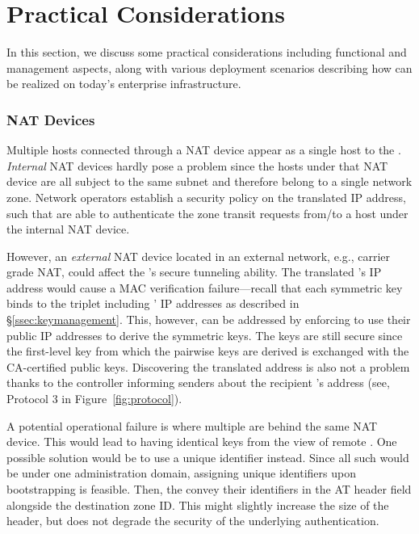 \chapter{Practical Considerations}
\label{practical}

In this section, we discuss some practical considerations including functional and 
management aspects, along with various deployment scenarios describing how \name can
be realized on today's enterprise infrastructure. 


\subsection{NAT Devices}
\label{ssec:nat}
Multiple hosts connected through a NAT device appear as a single host to the
\tp. \textit{Internal} NAT devices hardly pose a problem since the hosts under that NAT 
device are all subject to the same subnet and therefore belong to a single network zone. 
Network operators establish a security policy on the translated IP address, such 
that \tps are able to authenticate the zone transit requests from/to a host under the
internal NAT device.

However, an \textit{external} NAT device located in an external network, e.g., carrier grade NAT, 
could affect the \tp's secure tunneling ability. The translated \tp's IP address
would cause a MAC verification failure---recall that each symmetric key binds to the
triplet including \tps' IP addresses as described in \S\ref{ssec:keymanagement}. 
This, however, can be addressed by enforcing \tps to use their public IP addresses
to derive the symmetric keys. The keys are still secure since the first-level key
from which the pairwise keys are derived is exchanged with the CA-certified public
keys. Discovering the translated \tp address is also not a problem thanks to
the controller informing senders about the recipient \tp's address (see, Protocol 3 in 
Figure~\ref{fig:protocol}). 

A potential operational failure is where multiple \tps are behind the same NAT device.
This would lead to \tps having identical keys from the view of remote \tps. One possible solution
would be to use a unique \tp identifier instead. Since all such \tps would be under one administration domain, assigning unique \tp identifiers upon bootstrapping is feasible. Then, the \tps convey their identifiers in the AT header field alongside the destination zone ID. This
might slightly increase the size of the header, but does not degrade the security of
the underlying authentication.


